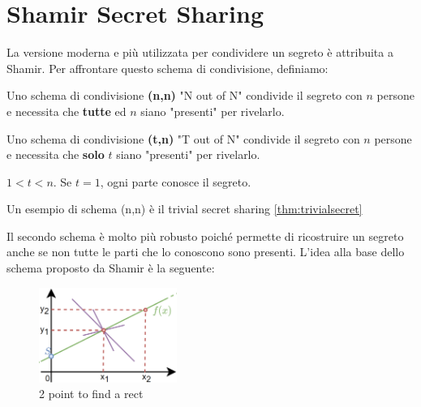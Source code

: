 \section{Shamir Secret Sharing}
La versione moderna e più utilizzata per condividere un segreto è attribuita a Shamir. Per affrontare questo schema di condivisione, definiamo:
\begin{definition}\label{def:noutn}
Uno schema di condivisione \textbf{(n,n)} "N out of N" condivide il segreto con $n$ persone e necessita che \textbf{tutte} ed $n$ siano "presenti" per rivelarlo.
\end{definition}
\begin{definition}\label{def:toutn}
Uno schema di condivisione \textbf{(t,n)} "T out of N" condivide il segreto con $n$ persone e necessita che \textbf{solo} $t$ siano "presenti" per rivelarlo.\\
\begin{remark}
$1<t<n$. Se $t=1$, ogni parte conosce il segreto.
\end{remark}
\end{definition}
\begin{note}
Un esempio di schema (n,n) è il trivial secret sharing \cref{thm:trivialsecret}
\end{note}
Il secondo schema è molto più robusto poiché permette di ricostruire un segreto anche se non tutte le parti che lo conoscono sono presenti. L'idea alla base dello schema proposto da Shamir è la seguente:
\begin{figure}
  \vspace{-20pt}
  \begin{center}
    \includegraphics[width=0.4\textwidth]{image/secret_sharing/rectfind.png}
  \end{center}
  \vspace{-20pt}
  \caption{2 point to find a rect}
  \label{fig:rectfind}
  \vspace{-10pt}
\end{figure}
